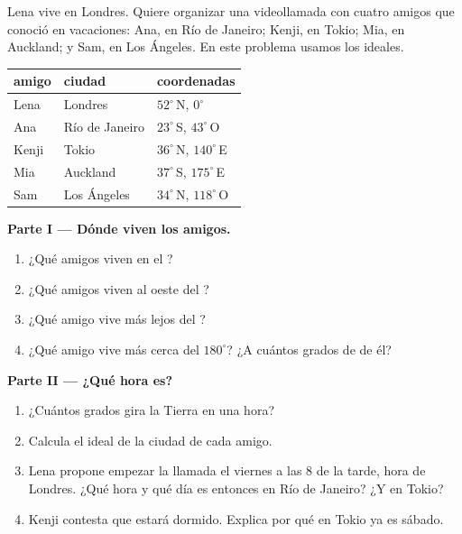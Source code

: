 \begin{problem}
\label{pb:g6:latitude-longitude:1}
Lena vive en Londres. Quiere organizar una videollamada con cuatro amigos
que conoció en vacaciones: Ana, en Río de Janeiro; Kenji, en Tokio; Mia, en
Auckland; y Sam, en Los Ángeles. En este problema usamos los 
ideales.

\begin{center}
\small
\begin{tabular}{lll}
\hline
amigo & ciudad & coordenadas\\
\hline
Lena & Londres & $52^\circ$\,N, $0^\circ$\\
Ana & Río de Janeiro & $23^\circ$\,S, $43^\circ$\,O\\
Kenji & Tokio & $36^\circ$\,N, $140^\circ$\,E\\
Mia & Auckland & $37^\circ$\,S, $175^\circ$\,E\\
Sam & Los Ángeles & $34^\circ$\,N, $118^\circ$\,O\\
\hline
\end{tabular}
\end{center}

\medskip
\noindent\textbf{Parte I --- Dónde viven los amigos.}
\begin{enumerate}
  \item ¿Qué amigos viven en el ?
  \item ¿Qué amigos viven al oeste del ?
  \item ¿Qué amigo vive más lejos del ?
  \item ¿Qué amigo vive más cerca del  $180^\circ$? ¿A cuántos
        grados de  de él?
\end{enumerate}

\medskip
\noindent\textbf{Parte II --- ¿Qué hora es?}
\begin{enumerate}[resume]
  \item ¿Cuántos grados gira la Tierra en una hora?
  \item Calcula el  ideal de la ciudad de cada amigo.
  \item Lena propone empezar la llamada el viernes a las 8 de la tarde,
        hora de Londres. ¿Qué hora y qué día es entonces en Río de Janeiro?
        ¿Y en Tokio?
  \item Kenji contesta que estará dormido. Explica por qué en Tokio ya es
        sábado.
\end{enumerate}


\end{problem}
